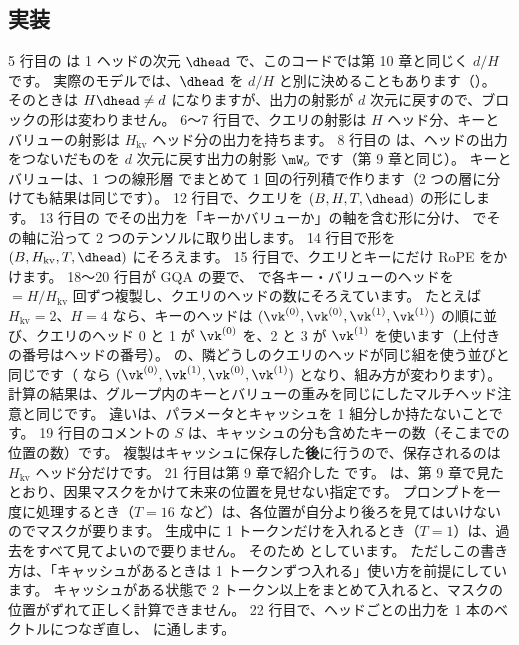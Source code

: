 \subsection*{実装}


5 行目の  は 1 ヘッドの次元 $\dhead$ で、このコードでは第 10 章と同じく $d/H$ です。
実際のモデルでは、$\dhead$ を $d/H$ と別に決めることもあります（）。
そのときは $H\dhead\ne d$ になりますが、出力の射影が $d$ 次元に戻すので、ブロックの形は変わりません。
6〜7 行目で、クエリの射影は $H$ ヘッド分、キーとバリューの射影は $H_{\mathrm{kv}}$ ヘッド分の出力を持ちます。
8 行目の  は、ヘッドの出力をつないだものを $d$ 次元に戻す出力の射影 $\mW_o$ です（第 9 章と同じ）。
キーとバリューは、1 つの線形層  でまとめて 1 回の行列積で作ります（2 つの層に分けても結果は同じです）。
12 行目で、クエリを $(B,H,T,\dhead)$ の形にします。
13 行目の  でその出力を「キーかバリューか」の軸を含む形に分け、 でその軸に沿って 2 つのテンソルに取り出します。
14 行目で形を $(B,H_{\mathrm{kv}},T,\dhead)$ にそろえます。
15 行目で、クエリとキーにだけ RoPE をかけます。
18〜20 行目が GQA の要で、 で各キー・バリューのヘッドを  $=H/H_{\mathrm{kv}}$ 回ずつ複製し、クエリのヘッドの数にそろえています。
たとえば $H_{\mathrm{kv}}=2$、$H=4$ なら、キーのヘッドは $(\vk^{(0)},\vk^{(0)},\vk^{(1)},\vk^{(1)})$ の順に並び、クエリのヘッド 0 と 1 が $\vk^{(0)}$ を、2 と 3 が $\vk^{(1)}$ を使います（上付きの番号はヘッドの番号）。
の、隣どうしのクエリのヘッドが同じ組を使う並びと同じです（ なら $(\vk^{(0)},\vk^{(1)},\vk^{(0)},\vk^{(1)})$ となり、組み方が変わります）。
計算の結果は、グループ内のキーとバリューの重みを同じにしたマルチヘッド注意と同じです。
違いは、パラメータとキャッシュを 1 組分しか持たないことです。
19 行目のコメントの $S$ は、キャッシュの分も含めたキーの数（そこまでの位置の数）です。
複製はキャッシュに保存した\textbf{後}に行うので、保存されるのは $H_{\mathrm{kv}}$ ヘッド分だけです。
21 行目は第 9 章で紹介した  です。
 は、第 9 章で見たとおり、因果マスクをかけて未来の位置を見せない指定です。
プロンプトを一度に処理するとき（$T=16$ など）は、各位置が自分より後ろを見てはいけないのでマスクが要ります。
生成中に 1 トークンだけを入れるとき（$T=1$）は、過去をすべて見てよいので要りません。
そのため  としています。
ただしこの書き方は、「キャッシュがあるときは 1 トークンずつ入れる」使い方を前提にしています。
キャッシュがある状態で 2 トークン以上をまとめて入れると、マスクの位置がずれて正しく計算できません。
22 行目で、ヘッドごとの出力を 1 本のベクトルにつなぎ直し、 に通します。

